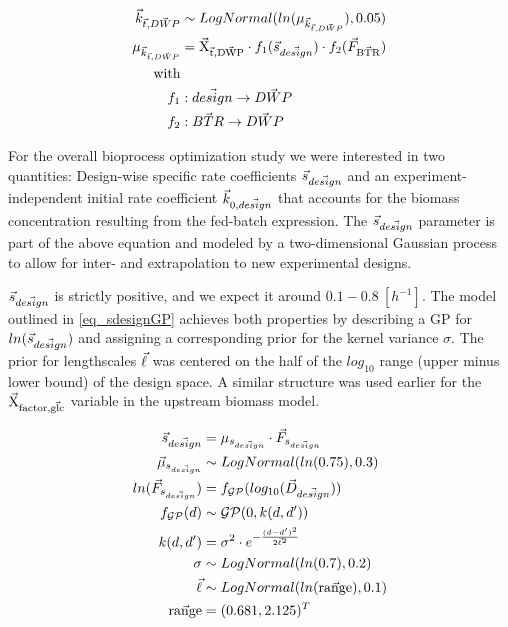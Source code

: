 \documentclass[sn-standardnature]{sn-jnl}%
\def\vec{\mathaccent "017E\relax }
\theoremstyle{thmstyleone}%
\theoremstyle{thmstyletwo}%
\theoremstyle{thmstylethree}%
\begin{document}
\begin{equation}
\begin{aligned}
    \vec{k}_{\vec{t},\vec{DWP}} &\sim LogNormal( ln(\mu_{\vec{k}_{\vec{t},\vec{DWP}}}), 0.05 ) \\
    \mu_{\vec{k}_{\vec{t},\vec{DWP}}} &= \mathrm{\vec{X}_{\vec{t},\vec{DWP}}} \cdot f_1( \vec{s}_{\vec{design}} ) \cdot f_2(\vec{F}_\mathrm{\vec{BTR}}) \\
    \textrm{with} \\
    f_1 &: \vec{design} \rightarrow \vec{DWP} \\
    f_2 &: \vec{BTR} \rightarrow \vec{DWP} \\
\end{aligned}
\label{eq_kdwp}
\end{equation}

For the overall bioprocess optimization study we were interested in two quantities:
Design-wise specific rate coefficients $\vec{s}_{\vec{design}}$ and an experiment-independent initial rate coefficient $\vec{k}_{0,\vec{design}}$ that accounts for the biomass concentration resulting from the fed-batch expression.
The $\vec{s}_{\vec{design}}$ parameter is part of the above equation and modeled by a two-dimensional Gaussian process to allow for inter- and extrapolation to new experimental designs.

$\vec{s}_{\vec{design}}$ is strictly positive, and we expect it around $0.1-0.8\ [h^{-1}]$.
The model outlined in \eqref{eq_sdesignGP} achieves both properties by describing a GP for $ln(\vec{s}_{\vec{design}})$ and assigning a corresponding prior for the kernel variance $\sigma$.
The prior for lengthscales $\vec{\ell}$ was centered on the half of the $log_{10}$ range (upper minus lower bound) of the design space.
A similar structure was used earlier for the $\mathrm{\vec{X}_{factor,\vec{glc}}}$ variable in the upstream biomass model.

\begin{equation}
\begin{aligned}
    \vec{s}_{\vec{design}} &= \mu_{s_{\vec{design}}} \cdot \vec{F}_{s_{\vec{design}}} \\
    \vec{\mu}_{s_{\vec{design}}} &\sim LogNormal(ln(0.75), 0.3) \\
    ln(\vec{F}_{s_{\vec{design}}}) &= f_\mathcal{GP}( log_{10}(\vec{D}_{\vec{design}}) ) \\
    f_\mathcal{GP}(d) &\sim \mathcal{GP}(0, k(d, d')) \\
    k(d,d') &= \sigma^2 \cdot e^{-\frac{(d-d')^2}{2\vec{\ell}^2}} \\
    \sigma &\sim LogNormal(ln(0.7), 0.2) \\
    \vec{\ell} &\sim LogNormal(ln(\mathrm{\vec{range}}), 0.1) \\
    \vec{\mathrm{range}} &= (0.681, 2.125)^T
\end{aligned}
\label{eq_sdesignGP}
\end{equation}
\end{document}
